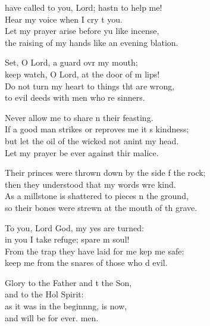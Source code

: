 \begin{psalmverse}
\begin{patverse}
 have called to you, Lord; hastn to help me!\Med\\
    Hear my voice when I cry t you.\\
Let my prayer arise before yu like incense,\Med\\
    the raising of my hands like an evening blation.

Set, O Lord, a guard ovr my mouth;\Med\\
    keep watch, O Lord, at the door of m lips!\\
Do not turn my heart to things tht are wrong,\Med\\
    to evil deeds with men who re sinners.

Never allow me to share \pointup{\i}n their feasting.\Med\\
    If a good man strikes or reproves me it \pointup{\i}s kindness;\\
but let the oil of the wicked not anint my head.\Med\\
    Let my prayer be ever against thir malice.

Their princes were thrown down by the side f the rock;\Med\\
    then they understood that my words wre kind.\\
As a millstone is shattered to pieces n the ground,\Med\\
    so their bones were strewn at the mouth of th grave.

To you, Lord God, my yes are turned:\Med\\
    in you I take refuge; spare m soul!\\
From the trap they have laid for me kep me safe:\Med\\
    keep me from the snares of those who d evil.

Glory to the Father and t the Son,\Med\\
    and to the Hol Spirit:\\
as it was in the beginn\pointup{\i}ng, is now,\Med\\
and will be for ever. men.
\end{patverse}
\end{psalmverse}
